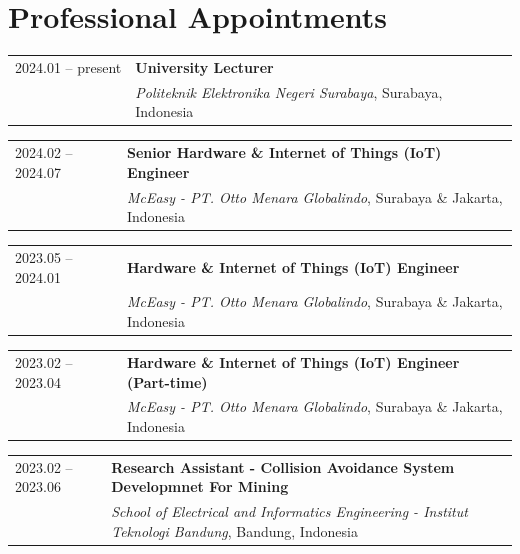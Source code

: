\section{Professional Appointments}

\noindent
\begin{tabularx}{\linewidth}{@{}l X@{}}
  2024.01 -- present & \textbf{University Lecturer} \\
                              & \textit{Politeknik Elektronika Negeri Surabaya}, Surabaya, Indonesia \\
\end{tabularx}\vspace{4pt}

\noindent
\begin{tabularx}{\linewidth}{@{}l X@{}}
  2024.02 -- 2024.07 & \textbf{Senior Hardware \& Internet of Things (IoT) Engineer} \\
                              & \textit{McEasy - PT. Otto Menara Globalindo}, Surabaya \& Jakarta, Indonesia \\
\end{tabularx}\vspace{4pt}

\noindent
\begin{tabularx}{\linewidth}{@{}l X@{}}
  2023.05 -- 2024.01 & \textbf{Hardware \& Internet of Things (IoT) Engineer} \\
                              & \textit{McEasy - PT. Otto Menara Globalindo}, Surabaya \& Jakarta, Indonesia \\
\end{tabularx}\vspace{4pt}

\noindent
\begin{tabularx}{\linewidth}{@{}l X@{}}
  2023.02 -- 2023.04 & \textbf{Hardware \& Internet of Things (IoT) Engineer (Part-time)} \\
                              & \textit{McEasy - PT. Otto Menara Globalindo}, Surabaya \& Jakarta, Indonesia \\
\end{tabularx}\vspace{4pt}

\noindent
\begin{tabularx}{\linewidth}{@{}l X@{}}
  2023.02 -- 2023.06 & \textbf{Research Assistant - Collision Avoidance System Developmnet For Mining} \\
                              & \textit{School of Electrical and Informatics Engineering - Institut Teknologi Bandung}, Bandung, Indonesia \\
\end{tabularx}\vspace{4pt}

